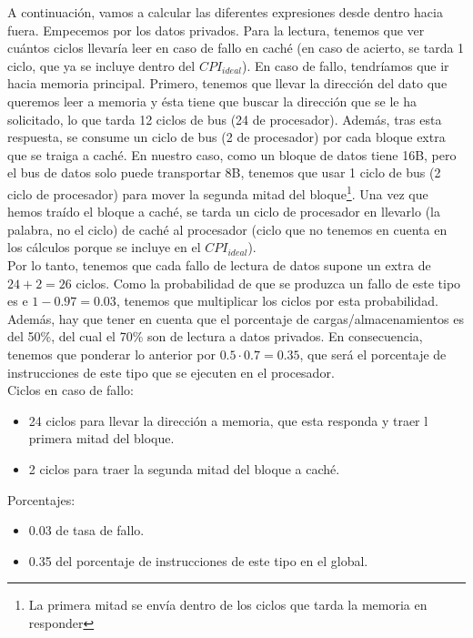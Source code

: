 \documentclass[12pt,a4paper]{article}
\begin{document}
A continuación, vamos a calcular las diferentes expresiones desde dentro hacia fuera. Empecemos por los datos privados. Para la lectura, tenemos que ver cuántos ciclos llevaría leer en caso de fallo en caché (en caso de acierto, se tarda 1 ciclo, que ya se incluye dentro del $CPI_{ideal}$). En caso de fallo, tendríamos que ir hacia memoria principal. Primero, tenemos que llevar la dirección del dato que queremos leer a memoria y ésta tiene que buscar la dirección que se le ha solicitado, lo que tarda 12 ciclos de bus (24 de procesador). Además, tras esta respuesta, se consume un ciclo de bus (2 de procesador) por cada bloque extra que se traiga a caché. En nuestro caso, como un bloque de datos tiene 16B, pero el bus de datos solo puede transportar 8B, tenemos que usar 1 ciclo de bus (2 ciclo de procesador) para mover la segunda mitad del bloque\footnote{La primera mitad se envía dentro de los ciclos que tarda la memoria en responder}. Una vez que hemos traído el bloque a caché, se tarda un ciclo de procesador en llevarlo (la palabra, no el ciclo) de caché al procesador (ciclo que no tenemos en cuenta en los cálculos porque se incluye en el $CPI_{ideal}$). \\

Por lo tanto, tenemos que cada fallo de lectura de datos supone un extra de $24+2=26$ ciclos. Como la probabilidad de que se produzca un fallo de este tipo es e $1-0.97=0.03$, tenemos que multiplicar los ciclos por esta probabilidad. Además, hay que tener en cuenta que el porcentaje de cargas/almacenamientos es del 50\%, del cual el 70\% son de lectura a datos privados. En consecuencia, tenemos que ponderar lo anterior por $0.5\cdot 0.7=0.35$, que será el porcentaje de instrucciones de este tipo que se ejecuten en el procesador.\\

Ciclos en caso de fallo:
\begin{itemize}
\item 24 ciclos para llevar la dirección a memoria, que esta responda y traer l primera mitad del bloque.
\item 2 ciclos para traer la segunda mitad del bloque a caché.
\end{itemize}

Porcentajes:
\begin{itemize}
\item 0.03 de tasa de fallo.
\item 0.35 del porcentaje de instrucciones de este tipo en el global.
\end{itemize}
\end{document}
